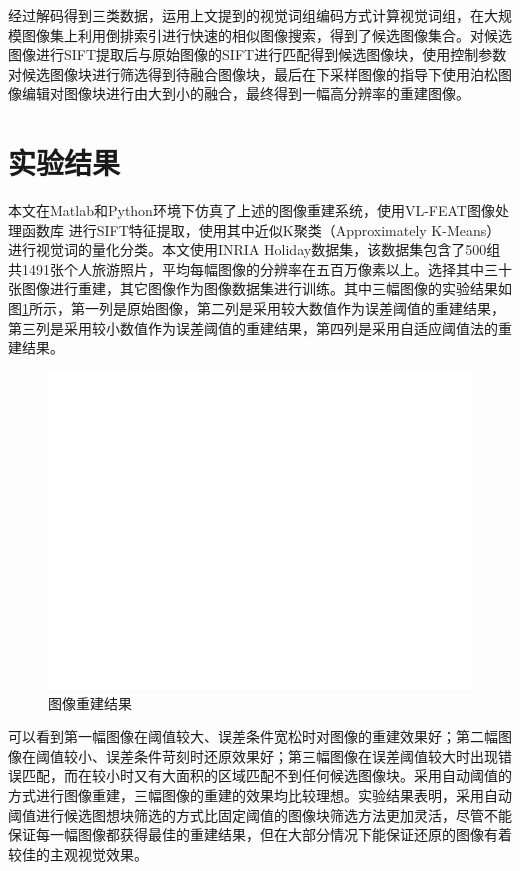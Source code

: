 \documentclass[UTF8]{csoarticle}
\begin{document}
经过解码得到三类数据，运用上文提到的视觉词组编码方式计算视觉词组，在大规模图像集上利用倒排索引进行快速的相似图像搜索，得到了候选图像集合。对候选图像进行SIFT提取后与原始图像的SIFT进行匹配得到候选图像块，使用控制参数对候选图像块进行筛选得到待融合图像块，最后在下采样图像的指导下使用泊松图像编辑对图像块进行由大到小的融合，最终得到一幅高分辨率的重建图像。

\section{实验结果}
本文在Matlab和Python环境下仿真了上述的图像重建系统，使用VL-FEAT图像处理函数库
进行SIFT特征提取，使用其中近似K聚类（Approximately K-Means）进行视觉词的量化分类。本文使用INRIA Holiday数据集，该数据集包含了500组共1491张个人旅游照片，平均每幅图像的分辨率在五百万像素以上。选择其中三十张图像进行重建，其它图像作为图像数据集进行训练。其中三幅图像的实验结果如图\ref{fig:result}所示，第一列是原始图像，第二列是采用较大数值作为误差阈值的重建结果，第三列是采用较小数值作为误差阈值的重建结果，第四列是采用自适应阈值法的重建结果。

\begin{figure}
\centering\includegraphics[width=15cm]{rec_result}
\caption{图像重建结果}
\label{fig:result}
\end{figure}

可以看到第一幅图像在阈值较大、误差条件宽松时对图像的重建效果好；第二幅图像在阈值较小、误差条件苛刻时还原效果好；第三幅图像在误差阈值较大时出现错误匹配，而在较小时又有大面积的区域匹配不到任何候选图像块。采用自动阈值的方式进行图像重建，三幅图像的重建的效果均比较理想。实验结果表明，采用自动阈值进行候选图想块筛选的方式比固定阈值的图像块筛选方法更加灵活，尽管不能保证每一幅图像都获得最佳的重建结果，但在大部分情况下能保证还原的图像有着较佳的主观视觉效果。
\end{document}

